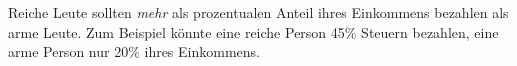 Reiche Leute sollten \emph{mehr} als prozentualen Anteil ihres Einkommens bezahlen als arme Leute.
Zum Beispiel könnte eine reiche Person 45\% Steuern bezahlen, eine arme Person nur 20\% ihres Einkommens.